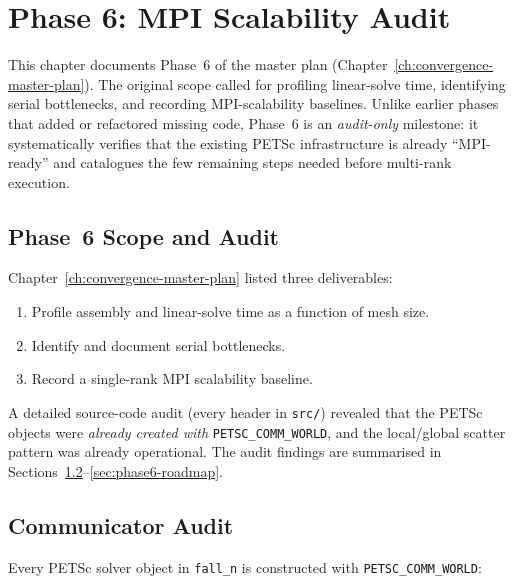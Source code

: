 
\chapter{Phase 6: MPI Scalability Audit}
\label{ch:phase6-mpi-scalability}

This chapter documents Phase~6 of the master plan
(Chapter~\ref{ch:convergence-master-plan}).
The original scope called for profiling linear-solve time, identifying
serial bottlenecks, and recording MPI-scalability baselines.
Unlike earlier phases that added or refactored missing code, Phase~6
is an \emph{audit-only} milestone: it systematically verifies that the
existing PETSc infrastructure is already ``MPI-ready'' and catalogues
the few remaining steps needed before multi-rank execution.


\section{Phase~6 Scope and Audit}
\label{sec:phase6-scope}

Chapter~\ref{ch:convergence-master-plan} listed three deliverables:
\begin{enumerate}
  \item Profile assembly and linear-solve time as a function of mesh size.
  \item Identify and document serial bottlenecks.
  \item Record a single-rank MPI scalability baseline.
\end{enumerate}

A detailed source-code audit (every header in \texttt{src/}) revealed that
the PETSc objects were \emph{already created with}
\texttt{PETSC\_COMM\_WORLD}, and the local/global scatter pattern was
already operational.
The audit findings are summarised in Sections\
\ref{sec:phase6-comm}--\ref{sec:phase6-roadmap}.


\section{Communicator Audit}
\label{sec:phase6-comm}

Every PETSc solver object in \texttt{fall\_n} is constructed with
\texttt{PETSC\_COMM\_WORLD}:

